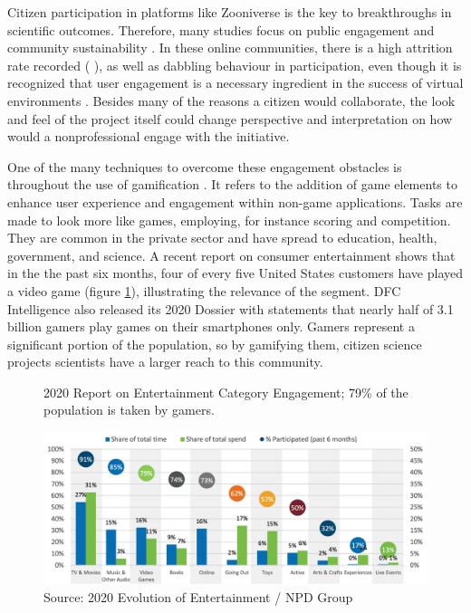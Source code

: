 Citizen participation in platforms like Zooniverse is the key to breakthroughs in scientific outcomes. Therefore, many studies focus on public engagement and community sustainability \cite{aristeidou2017profiles}. In these online communities, there is a high attrition rate recorded (\cite{nov2011technology} \cite{ponciano2015finding}), as well as dabbling behaviour \cite{eveleigh2014designing} in participation, even though it is recognized that user engagement is a necessary ingredient in the success of virtual environments \cite{verhagen2015benefitting}. Besides many of the reasons a citizen would collaborate, the look and feel of the project itself could change perspective and interpretation on how would a nonprofessional engage with the initiative.

One of the many techniques to overcome these engagement obstacles is throughout the use of gamification \cite{bowser2013using}. It refers to the addition of game elements to enhance user experience and engagement within non-game applications. Tasks are made to look more like games, employing, for instance scoring and competition. They are common in the private sector and have spread to education, health, government, and science. A recent report on consumer entertainment shows that in the the past six months, four of every five United States customers have played a video game (figure \ref{fig:entertainment-report}), illustrating the relevance of the segment. DFC Intelligence also released its 2020 Dossier with statements that nearly half of 3.1 billion gamers play games on their smartphones only. Gamers represent a significant portion of the population, so by gamifying them, citizen science projects scientists have a larger reach to this community.

\begin{figure}[ht]
    \centering
    \caption{2020 Report on Entertainment Category Engagement; 79\% of the population is taken by gamers.}
    \includegraphics[width=\linewidth]{images/game.png}
    \caption*{Source: 2020 Evolution of Entertainment / NPD Group}
    \label{fig:entertainment-report}
\end{figure}

